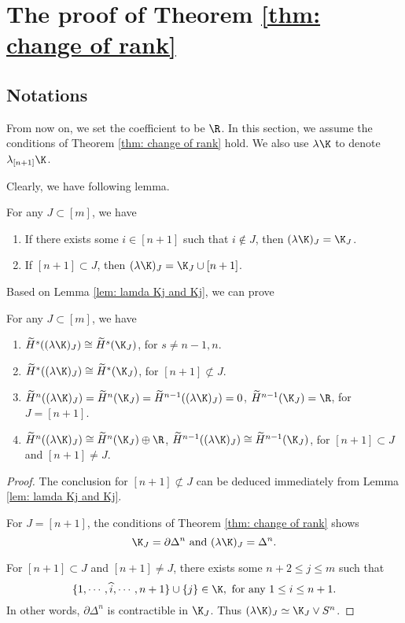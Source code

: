 \section{The proof of Theorem \ref{thm: change of rank}}
\label{sec: The proof of Theorem 1}
\subsection*{Notations}
From now on, we set the coefficient to be $\R$. In this section, we
assume the conditions of Theorem \ref{thm: change of rank} hold. We
also use $\lambda\K$ to denote $\lambda_{[n+1]}\K$.


Clearly, we have following lemma.
\begin{lem}
    \label{lem: lamda Kj and Kj}
    For any $J\subset [m]$, we have
    \begin{enumerate}
        \item 
        If there exists some $i\in [n+1]$ such that $i\not\in J$,
        then $(\lambda\K)_J=\K_J$.
        \item 
        If $[n+1]\subset J$, then $(\lambda\K)_J=\K_J\cup [n+1]$.
    \end{enumerate}
\end{lem}

Based on Lemma \ref{lem: lamda Kj and Kj}, we can prove
\begin{lem}
    \label{lem: H*lamda Kj and H*Kj}
    For any $J\subset [m]$, we have
    \begin{enumerate}
        \item 
        $\widetilde{H}^s((\lambda\K)_J)\cong 
        \widetilde{H}^s(\K_J)$, for $s\not = n-1,n$.
        \item 
        $\widetilde{H}^*((\lambda\K)_J)\cong
        \widetilde{H}^*(\K_J)$, for $[n+1]\not\subset J$.
        \item 
        $\widetilde{H}^n((\lambda\K)_{J})=
        \widetilde{H}^n(\K_J)=\widetilde{H}^{n-1}((\lambda
        \K)_{J})=0$, 
        $\widetilde{H}^{n-1}(\K_J)=\R$, for $J=[n+1]$.
        \item 
        $\widetilde{H}^n((\lambda\K)_{J})\cong
        \widetilde{H}^n(\K_J)\oplus\R$, $\widetilde{H}^{n-1}((\lambda\K)_{J})\cong
        \widetilde{H}^{n-1}(\K_J)$, for $[n+1]\subset J$
        and $[n+1]\not = J$.
    \end{enumerate}
\end{lem}

\begin{proof}
The conclusion for $[n+1]\not\subset J$ can be deduced immediately
    from Lemma \ref{lem: lamda Kj and Kj}.

For $J=[n+1]$, the conditions of Theorem \ref{thm: change of rank} shows
$$\K_J=\partial\Delta^n \text{ and } (\lambda\K)_{J}=\Delta^n.$$

For $[n+1]\subset J$ and $[n+1]\not = J$, there exists some $n+2\le j\le m$
such that
$$\{1,\cdots,\widehat{i},\cdots,n+1\}\cup \{j\}\in \K, \text{ for any }
1\le i\le n+1.$$
In other words, $\partial \Delta^n$ is contractible in $\K_J$.
Thus $(\lambda\K)_{J}\simeq \K_J\vee S^n$.
\end{proof}

